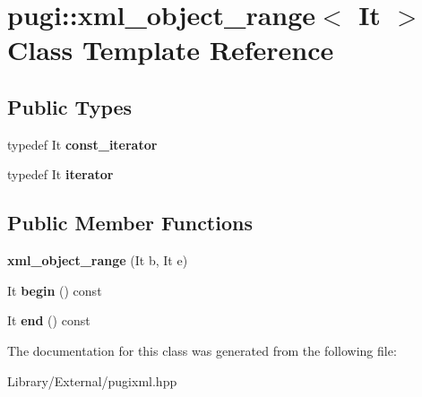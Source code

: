 \hypertarget{classpugi_1_1xml__object__range}{}\section{pugi\+:\+:xml\+\_\+object\+\_\+range$<$ It $>$ Class Template Reference}
\label{classpugi_1_1xml__object__range}
\subsection*{Public Types}
\begin{DoxyCompactItemize}
\item 
\hypertarget{classpugi_1_1xml__object__range_ace38fcf448c7134e13612f7ce439246c}{}typedef It {\bfseries const\+\_\+iterator}\label{classpugi_1_1xml__object__range_ace38fcf448c7134e13612f7ce439246c}

\item 
\hypertarget{classpugi_1_1xml__object__range_a024ce5292d3b9f2164c1230855fdb501}{}typedef It {\bfseries iterator}\label{classpugi_1_1xml__object__range_a024ce5292d3b9f2164c1230855fdb501}

\end{DoxyCompactItemize}
\subsection*{Public Member Functions}
\begin{DoxyCompactItemize}
\item 
\hypertarget{classpugi_1_1xml__object__range_abf214db65eac081e4478169cb03bce67}{}{\bfseries xml\+\_\+object\+\_\+range} (It b, It e)\label{classpugi_1_1xml__object__range_abf214db65eac081e4478169cb03bce67}

\item 
\hypertarget{classpugi_1_1xml__object__range_ad8d64cefea10330a0f975fbb13a99a8a}{}It {\bfseries begin} () const \label{classpugi_1_1xml__object__range_ad8d64cefea10330a0f975fbb13a99a8a}

\item 
\hypertarget{classpugi_1_1xml__object__range_ad2c9b91aca1c3d4761c767af29a9d7ff}{}It {\bfseries end} () const \label{classpugi_1_1xml__object__range_ad2c9b91aca1c3d4761c767af29a9d7ff}

\end{DoxyCompactItemize}


The documentation for this class was generated from the following file\+:\begin{DoxyCompactItemize}
\item 
Library/\+External/pugixml.\+hpp\end{DoxyCompactItemize}

